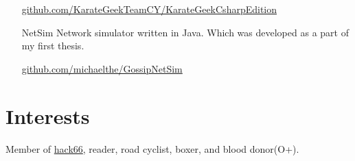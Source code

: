 \documentclass[margin, 10pt]{res} %
\begin{document}
\begin{resume}
\begin{itemize}
\href{https://github.com/KarateGeekTeamCY/KarateGeekCsharpEdition/tree/baseV4.5.1}{github.com/KarateGeekTeamCY/KarateGeekCsharpEdition} \\

\item[NetSim] Network simulator written in Java.
Which was developed as a part of my first thesis.

\href{https://github.com/michaelthe/GossipNetSim}{github.com/michaelthe/GossipNetSim}

\end{itemize}

\section{Interests}

Member of \href{http://hack66.info/}{hack66}, reader, road cyclist, boxer, and blood donor(O+).

\end{resume}
\end{document}
